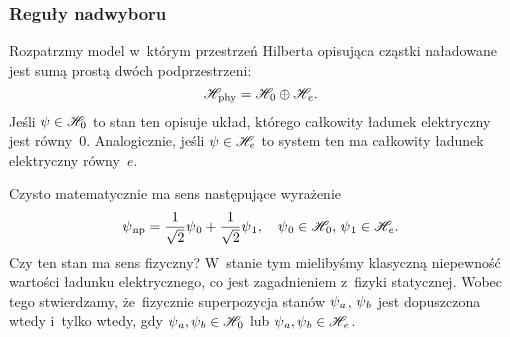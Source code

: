 \documentclass[10pt,t]{beamer}
\begin{document}
\begin{frame}
  \frametitle{Reguły nadwyboru}


  Rozpatrzmy model w~którym przestrzeń Hilberta opisująca cząstki
  naładowane jest sumą prostą dwóch podprzestrzeni:
  \begin{equation}
    \label{eq:Glowne-rodzaje-problemow-podczerwonych-01}
    \mathcal{H}_{ \hspace{0.07em} \text{phy} } =
    \mathcal{H}_{ \hspace{0.07em} 0 } \oplus \mathcal{H}_{ \hspace{0.07em} e }.
  \end{equation}
  Jeśli $\psi \in \mathcal{H}_{ 0 }$ to stan ten opisuje układ, którego całkowity
  ładunek elektryczny jest równy~$0$. Analogicznie, jeśli
  $\psi \in \mathcal{H}_{ e }$ to system ten ma całkowity ładunek elektryczny
  równy~$e$.

  Czysto matematycznie ma sens następujące wyrażenie
  \begin{equation}
    \label{eq:Glowne-rodzaje-problemow-podczerwonych-02}
    \psi_{ \hspace{0.07em} \text{np} } =
    \frac{ 1 }{ \sqrt{ 2 } } \psi_{ \hspace{0.07em} 0 } +
    \frac{ 1 }{ \sqrt{ 2 } } \psi_{ \hspace{0.07em} 1 }, \quad
    \psi_{ \hspace{0.07em} 0 } \in \mathcal{H}_{ \hspace{0.07em} 0 }, \,
    \psi_{ \hspace{0.07em} 1 } \in \mathcal{H}_{ \hspace{0.07em} e }.
  \end{equation}
  Czy ten stan ma sens fizyczny? W~stanie tym mielibyśmy \alert{klasyczną}
  niepewność wartości ładunku elektrycznego, co jest zagadnieniem z~fizyki
  statycznej. Wobec tego stwierdzamy, że~\alert{fizycznie} superpozycja
  stanów $\psi_{ \hspace{0.05em} a }$, $\psi_{ \hspace{0.05em} b }$ jest dopuszczona wtedy
  i~tylko wtedy,
  gdy $\psi_{ \hspace{0.05em} a }, \psi_{ \hspace{0.05em} b } \in \mathcal{H}_{ \hspace{0.07em} 0 }$
  lub $\psi_{ \hspace{0.05em} a }, \psi_{ \hspace{0.05em} b } \in \mathcal{H}_{ \hspace{0.07em} e }$.

\end{frame}
\end{document}
